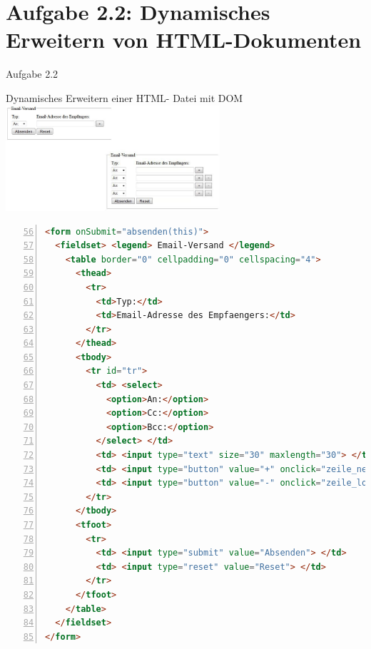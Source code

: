 \section{Aufgabe 2.2: Dynamisches Erweitern von HTML-Dokumenten}
\begin{frame}[<+->]{Aufgabe 2.2}
\begin{center}
\normalsize{
Dynamisches Erweitern einer HTML- Datei mit DOM}
\includegraphics[width = 300px]{../A2/src/formular1.jpg}
\end{center}
\end{frame}
\tiny{\begin{lstlisting}[language = HTML,
                                   mathescape = true, 
                   breaklines=true, 
                   numbers = left,
	        firstnumber= 56, 
                   numbersep = 3pt]
<form onSubmit="absenden(this)">
  <fieldset> <legend> Email-Versand </legend>
    <table border="0" cellpadding="0" cellspacing="4">
      <thead>
        <tr>
          <td>Typ:</td>
          <td>Email-Adresse des Empfaengers:</td>
        </tr>
      </thead>
      <tbody>
        <tr id="tr">
          <td> <select>
            <option>An:</option>
            <option>Cc:</option>
            <option>Bcc:</option>
          </select> </td>
          <td> <input type="text" size="30" maxlength="30"> </td>
          <td> <input type="button" value="+" onclick="zeile_neu()"> </td>
          <td> <input type="button" value="-" onclick="zeile_loeschen(this.parentNode)" style="visibility:hidden"> </td>
        </tr>
      </tbody>
      <tfoot>
        <tr>
          <td> <input type="submit" value="Absenden"> </td>
          <td> <input type="reset" value="Reset"> </td>
        </tr>
      </tfoot>
    </table>
  </fieldset>
</form>
\end{lstlisting}}
